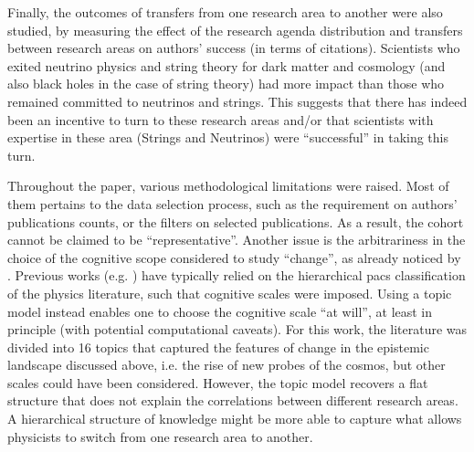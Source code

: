\documentclass{article}
\begin{document}
Finally, the outcomes of transfers from one research area to another were also studied, by measuring the effect of the research agenda distribution and transfers between research areas on authors' success (in terms of citations). Scientists who exited neutrino physics and string theory for dark matter and cosmology (and also black holes in the case of string theory) had more impact than those who remained committed to neutrinos and strings. This suggests that there has indeed been an incentive to turn to these research areas and/or that scientists with expertise in these area (Strings and Neutrinos) were ``successful'' in taking this turn.





Throughout the paper, various methodological limitations were raised. Most of them pertains to the data selection process, such as the requirement on authors' publications counts, or the filters on selected publications. As a result, the cohort cannot be claimed to be ``representative''. Another issue is the arbitrariness in the choice of the cognitive scope considered to study ``change'', as already noticed by \citet{Gieryn1978}. Previous works (e.g. \citealt{Tripodi2020,Aleta2019,Battiston2019,Jia2017}) have typically relied on the hierarchical \gls{pacs} classification of the physics literature, such that cognitive scales were imposed. Using a topic model instead enables one to choose the cognitive scale ``at will'', at least in principle (with potential computational caveats). For this work, the literature was divided into 16 topics that captured the features of change in the epistemic landscape discussed above, i.e. the rise of new probes of the cosmos, but other scales could have been considered. However, the topic model recovers a flat structure that does not explain the correlations between different research areas. A hierarchical structure of knowledge might be more able to capture what allows physicists to switch from one research area to another.
\end{document}
